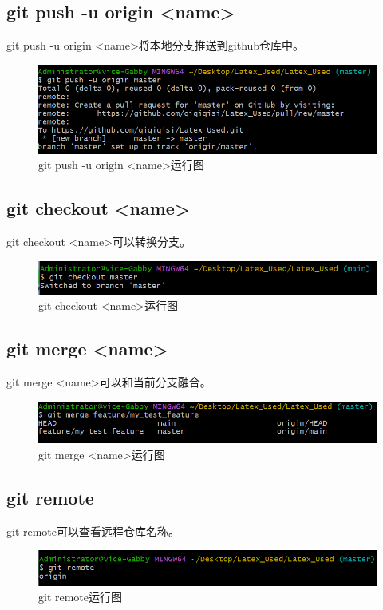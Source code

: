 \documentclass{article}
\begin{document}
\subsection{git push -u origin <name>}
git push -u origin <name>将本地分支推送到github仓库中。
\begin{figure}[H]
    \centering
    \includegraphics[width=1\linewidth]{git_push_branch.png}
    \caption{git push -u origin <name>运行图}
    \label{fig:pushfile}
\end{figure}

\subsection{git checkout <name>}
git checkout <name>可以转换分支。
\begin{figure}[H]
    \centering
    \includegraphics[width=1\linewidth]{git_checkout.png}
    \caption{git checkout <name>运行图}
    \label{fig:checkout}
\end{figure}

\subsection{git merge <name>}
git merge <name>可以和当前分支融合。
\begin{figure}[H]
    \centering
    \includegraphics[width=1\linewidth]{git_merge.png}
    \caption{git merge <name>运行图}
    \label{fig:merge}
\end{figure}

\subsection{git remote}
git remote可以查看远程仓库名称。
\begin{figure}[H]
    \centering
    \includegraphics[width=1\linewidth]{git_remote.png}
    \caption{git remote运行图}
    \label{fig:remote}
\end{figure}
\end{document}
